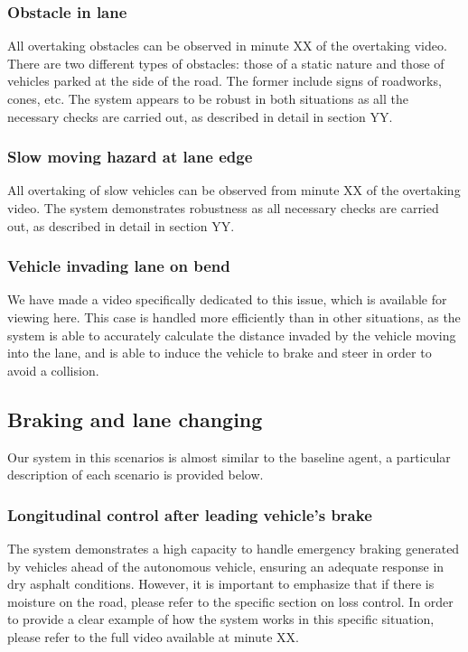 \documentclass{article}
\begin{document}
\subsubsection{Obstacle in lane}
All overtaking obstacles can be observed in minute XX of the overtaking video. There are two different types of obstacles: those of a static nature and 
those of vehicles parked at the side of the road. The former include signs of roadworks, cones, etc. The system appears to be robust in both situations 
as all the necessary checks are carried out, as described in detail in section YY.
\subsubsection{Slow moving hazard at lane edge}
All overtaking of slow vehicles can be observed from minute XX of the overtaking video. The system demonstrates robustness as all necessary checks are 
carried out, as described in detail in section YY.
\subsubsection{Vehicle invading lane on bend}
We have made a video specifically dedicated to this issue, which is available for viewing here. This case is handled more efficiently than in other situations, 
as the system is able to accurately calculate the distance invaded by the vehicle moving into the lane, and is able to induce the vehicle to brake and steer in 
order to avoid a collision.

\subsection{Braking and lane changing}
Our system in this scenarios is almost similar to the baseline agent, a particular description of each scenario is provided below.
\subsubsection{Longitudinal control after leading vehicle’s brake}
The system demonstrates a high capacity to handle emergency braking generated by vehicles ahead of the autonomous vehicle, ensuring an adequate response in 
dry asphalt conditions. However, it is important to emphasize that if there is moisture on the road, please refer to the specific section on loss control. 
In order to provide a clear example of how the system works in this specific situation, please refer to the full video available at minute XX.
\end{document}
